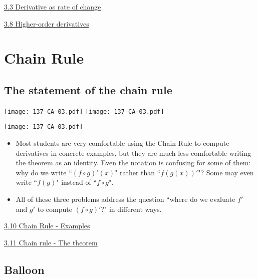 \documentclass[11pt]{article}
\newcommand{\nl}{\hfill \vspace{-1.1\baselineskip}} %
\newcommand{\viii}{\hspace{8mm} \href{https://www.youtube.com/watch?v=fUjLN1ZEDBc&list=PLlwePzQY_wW8qiZD6XYqCnibdY37ygbx7&index=3}{3.3 Derivative as rate of change}}
\newcommand{\vviii}{\hspace{8mm} \href{https://www.youtube.com/watch?v=7su5mypmgdw&list=PLlwePzQY_wW8qiZD6XYqCnibdY37ygbx7&index=8}{3.8 Higher-order derivatives}}
\newcommand{\vx}{\hspace{8mm} \href{https://www.youtube.com/watch?v=Qht28m7b13U&list=PLlwePzQY_wW8qiZD6XYqCnibdY37ygbx7&index=10}{3.10 Chain Rule - Examples}}
\newcommand{\vxi}{\hspace{8mm} \href{https://www.youtube.com/watch?v=DQiXqChpeAc&list=PLlwePzQY_wW8qiZD6XYqCnibdY37ygbx7&index=11}{3.11 Chain rule - The theorem}}
\begin{document}
\begin{videos}
\viii

\vviii
\end{videos}

\newpage


\section{Chain Rule}

\subsection{The statement of the chain rule} 

\begin{center}
{ \texttt{[image: 137-CA-03.pdf]}} \quad
{ \texttt{[image: 137-CA-03.pdf]}} 

{ \texttt{[image: 137-CA-03.pdf]}} 
\end{center}


\begin{comments}
\nl
	\begin{itemize}
		\item  Most students are very comfortable using the Chain Rule to compute derivatives in concrete examples, but they are much less comfortable writing the theorem as an identity. Even the notation is confusing for some of them: why do we write ``$(f \circ g)'(x)$" rather than ``$f(g(x))'$"?  Some may even write ``$f(g)$" instead of ``$f \circ g$".  
		\item All of these three problems address the question ``where do we evaluate $f'$ and $g'$ to compute $(f \circ g)'$?" in different ways.
	\end{itemize}

\end{comments}

\begin{videos}
\vx

\vxi
\end{videos}

\newpage

\subsection{Balloon} 
\end{document}
